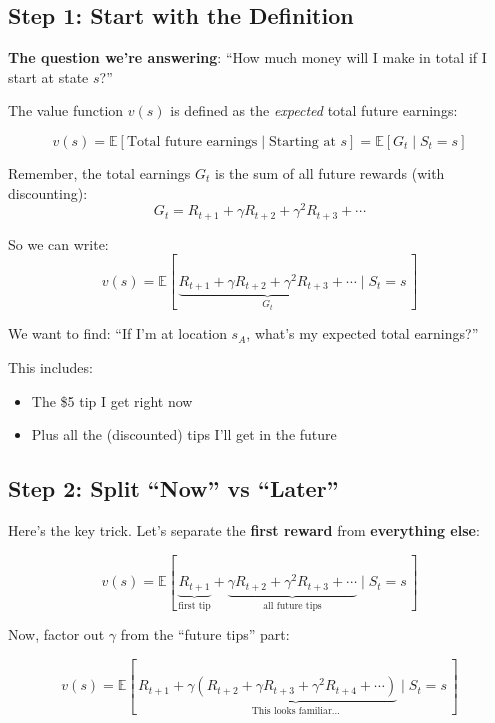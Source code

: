 \documentclass[journal, onecolumn]{IEEEtran}
\begin{document}
\newpage
\subsection{Step 1: Start with the Definition}

\textbf{The question we're answering}: ``How much money will I make in total if I start at state $s$?''

The value function $v(s)$ is defined as the \textit{expected} total future earnings:

\begin{framed}
\centering
\[ v(s) = \mathbb{E}[\text{Total future earnings} \mid \text{Starting at } s] = \mathbb{E}[G_t \mid S_t = s] \]
\end{framed}

Remember, the total earnings $G_t$ is the sum of all future rewards (with discounting):
\[ G_t = R_{t+1} + \gamma R_{t+2} + \gamma^2 R_{t+3} + \cdots \]

So we can write:
\[ v(s) = \mathbb{E}[\, \underbrace{R_{t+1} + \gamma R_{t+2} + \gamma^2 R_{t+3} + \cdots}_{G_t} \mid S_t = s \,] \]

\begin{tcolorbox}[examplebox={What This Means for $s_A$}]
We want to find: ``If I'm at location $s_A$, what's my expected total earnings?''

This includes:
\begin{itemize}[itemsep=0pt]
    \item The \$5 tip I get right now
    \item Plus all the (discounted) tips I'll get in the future
\end{itemize}
\end{tcolorbox}

\vspace{1em}
\subsection{Step 2: Split ``Now'' vs ``Later''}

Here's the key trick. Let's separate the \textbf{first reward} from \textbf{everything else}:

\[ v(s) = \mathbb{E}[\,\underbrace{R_{t+1}}_{\text{first tip}} + \underbrace{\gamma R_{t+2} + \gamma^2 R_{t+3} + \cdots}_{\text{all future tips}} \mid S_t = s\,] \]

Now, factor out $\gamma$ from the ``future tips'' part:

\[ v(s) = \mathbb{E}[\,R_{t+1} + \gamma \underbrace{(R_{t+2} + \gamma R_{t+3} + \gamma^2 R_{t+4} + \cdots)}_{\text{This looks familiar...}} \mid S_t = s\,] \]
\end{document}
